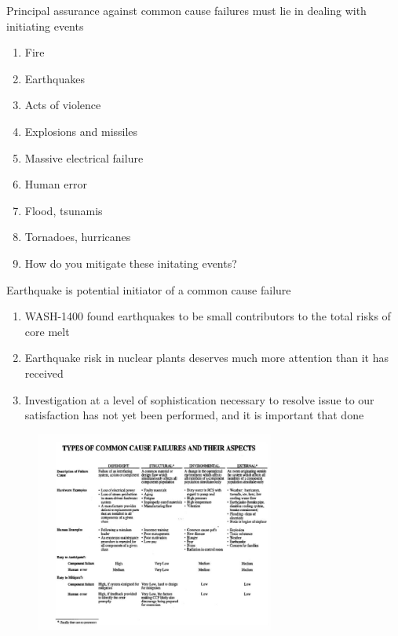 \documentclass[aspectratio=1610,pdftex,dvipsnames,compress,xcolor={dvipsnames}]{beamer}
\begin{document}
\begin{frame}{Principal assurance against common cause failures must lie in dealing with initiating events}
    \begin{enumerate}[series=outerlist,topsep=0pt,itemsep=11pt,leftmargin=*,label=(\arabic*)]
        \item Fire
        \item Earthquakes
        \item Acts of violence
        \item Explosions and missiles
        \item Massive electrical failure
        \item Human error
        \item Flood, tsunamis
        \item Tornadoes, hurricanes
            \vspace{0.10in}
        \item[]How do you mitigate these initating events?
    \end{enumerate}
\end{frame}


\begin{frame}{Earthquake is potential initiator of a common cause failure}
    \begin{enumerate}[series=outerlist,topsep=0pt,itemsep=21pt,leftmargin=*,label=(\arabic*)]
        \item[]WASH-1400 found earthquakes to be small contributors to the total risks of core melt
        \item[]Earthquake risk in nuclear plants deserves much more attention than it has received
        \item[]Investigation at a level of sophistication necessary to resolve issue to our satisfaction has not yet been performed, and it is important that done
    \end{enumerate}
\end{frame}


\begin{frame}{}
    \begin{figure}
        \centering
        \includegraphics[width=0.70\textwidth]{common.cause.failures.jpg}
    \end{figure}
\end{frame}
\end{document}
